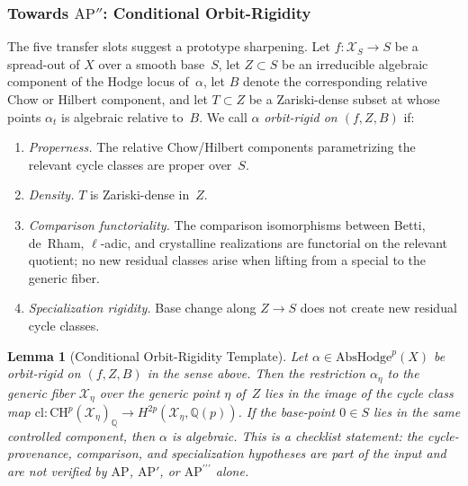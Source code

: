 \documentclass[aps,prd,twocolumn,superscriptaddress,nofootinbib]{revtex4-2}
\newtheorem{lemma}[theorem]{Lemma}
\theoremstyle{definition}
\theoremstyle{remark}
\begin{document}
\subsubsection*{Towards \texorpdfstring{$\mathrm{AP}''$}{AP''}: Conditional Orbit-Rigidity}
\label{subsec:orbit-rigidity}

The five transfer slots suggest a prototype sharpening.  Let
$f\colon \mathcal{X}_{S}\to S$ be a spread-out of $X$ over a smooth
base~$S$, let $Z\subset S$ be an irreducible algebraic component of the
Hodge locus of~$\alpha$, let $B$ denote the corresponding relative
Chow or Hilbert component, and let $T\subset Z$ be a Zariski-dense
subset at whose points $\alpha_{t}$ is algebraic relative to~$B$.
We call $\alpha$ \emph{orbit-rigid on $(f,Z,B)$} if:
\begin{enumerate}
\item[(i)] \emph{Properness.} The relative Chow/Hilbert components
  parametrizing the relevant cycle classes are proper over~$S$.
\item[(ii)] \emph{Density.} $T$ is Zariski-dense in~$Z$.
\item[(iii)] \emph{Comparison functoriality.}  The comparison
  isomorphisms between Betti, de~Rham, $\ell$-adic, and crystalline
  realizations are functorial on the relevant quotient; no new residual
  classes arise when lifting from a special to the generic fiber.
\item[(iv)] \emph{Specialization rigidity.}  Base change along
  $Z\to S$ does not create new residual cycle classes.
\end{enumerate}

\begin{lemma}[Conditional Orbit-Rigidity Template]
\label{lem:orbit-rigidity}
Let $\alpha\in\mathrm{AbsHodge}^{p}(X)$ be orbit-rigid on $(f,Z,B)$
in the sense above.  Then the restriction $\alpha_{\eta}$ to the generic
fiber $\mathcal{X}_{\eta}$ over the generic point $\eta$ of~$Z$ lies in
the image of the cycle class map
$\mathrm{cl}\colon\mathrm{CH}^{p}(\mathcal{X}_{\eta})_{\mathbb{Q}}\to
H^{2p}(\mathcal{X}_{\eta},\mathbb{Q}(p))$.
If the base-point $0\in S$ lies in the same controlled component,
then $\alpha$ is algebraic.
This is a checklist statement: the cycle-provenance, comparison, and
specialization hypotheses are part of the input and are not verified by
$\mathrm{AP}$, $\mathrm{AP}'$, or $\mathrm{AP}^{\prime\prime\prime}$ alone.
\end{lemma}
\end{document}
